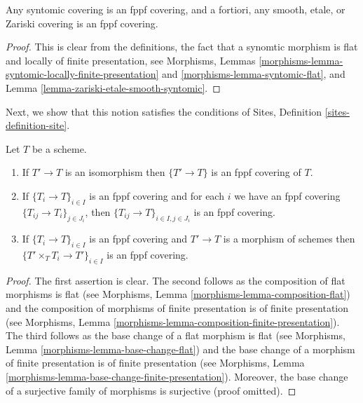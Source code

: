 \begin{lemma}
\label{lemma-zariski-etale-smooth-syntomic-fppf}
Any syntomic covering is an fppf covering, and a fortiori,
any smooth, etale, or Zariski covering is an fppf covering.
\end{lemma}

\begin{proof}
This is clear from the definitions, the fact that a synomtic morphism
is flat and locally of finite presentation, see
Morphisms, Lemmas
\ref{morphisms-lemma-syntomic-locally-finite-presentation} and
\ref{morphisms-lemma-syntomic-flat},
and
Lemma \ref{lemma-zariski-etale-smooth-syntomic}.
\end{proof}

\noindent
Next, we show that this notion satisfies the conditions of
Sites, Definition \ref{sites-definition-site}.

\begin{lemma}
\label{lemma-fppf}
Let $T$ be a scheme.
\begin{enumerate}
\item If $T' \to T$ is an isomorphism then $\{T' \to T\}$
is an fppf covering of $T$.
\item If $\{T_i \to T\}_{i\in I}$ is an fppf covering and for each
$i$ we have an fppf covering $\{T_{ij} \to T_i\}_{j\in J_i}$, then
$\{T_{ij} \to T\}_{i \in I, j\in J_i}$ is an fppf covering.
\item If $\{T_i \to T\}_{i\in I}$ is an fppf covering
and $T' \to T$ is a morphism of schemes then
$\{T' \times_T T_i \to T'\}_{i\in I}$ is an fppf covering.
\end{enumerate}
\end{lemma}

\begin{proof}
The first assertion is clear.
The second follows as the composition of flat morphisms is flat
(see Morphisms, Lemma \ref{morphisms-lemma-composition-flat})
and the composition of morphisms of finite presentation is
of finite presentation
(see Morphisms, Lemma \ref{morphisms-lemma-composition-finite-presentation}).
The third follows as the base change of a flat morphism is flat
(see Morphisms, Lemma \ref{morphisms-lemma-base-change-flat})
and the base change of a morphism of finite presentation is
of finite presentation
(see Morphisms, Lemma \ref{morphisms-lemma-base-change-finite-presentation}).
Moreover, the base change of a surjective family of morphisms is surjective
(proof omitted).
\end{proof}

